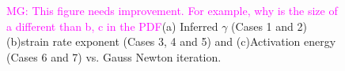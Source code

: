 \documentclass[12pt]{article}
\newcommand{\mgnote}[1]{\textcolor{magenta}{MG: #1}}
\begin{document}
\begin{figure}[H]
\centering

\caption{\mgnote{This figure needs improvement. For example, why is the size of a different than b, c in the PDF}(a) Inferred $\gamma$ (Cases 1 and 2) (b)strain rate exponent (Cases 3, 4 and 5) and (c)Activation energy (Cases 6 and 7) vs. Gauss Newton iteration.}
\label{fig:inversion_prefactor}
\end{figure}




\end{document}
